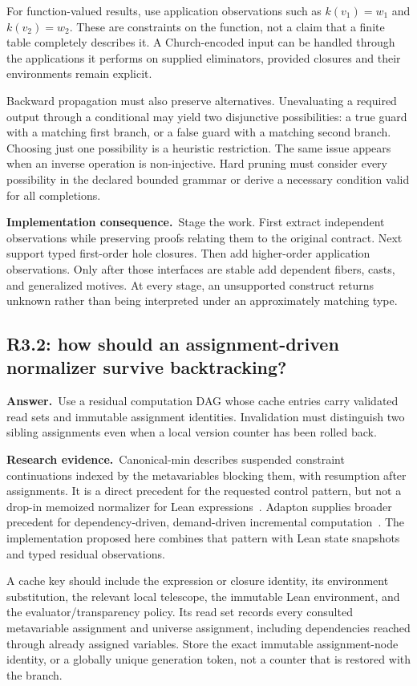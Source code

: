 \documentclass[11pt,a4paper]{article}
\theoremstyle{definition}
\theoremstyle{remark}
\newcommand{\ans}{\noindent\textbf{Answer.}\ }
\newcommand{\imp}{\par\noindent\textbf{Implementation consequence.}\ }
\newcommand{\lit}{\par\noindent\textbf{Research evidence.}\ }
\begin{document}
For function-valued results, use application observations such as
$k(v_1)=w_1$ and $k(v_2)=w_2$. These are constraints on the function, not a claim
that a finite table completely describes it. A Church-encoded input can be
handled through the applications it performs on supplied eliminators, provided
closures and their environments remain explicit.

Backward propagation must also preserve alternatives. Unevaluating a required
output through a conditional may yield two disjunctive possibilities: a true
guard with a matching first branch, or a false guard with a matching second
branch. Choosing just one possibility is a heuristic restriction. The same
issue appears when an inverse operation is non-injective. Hard pruning must
consider every possibility in the declared bounded grammar or derive a
necessary condition valid for all completions.

\imp Stage the work. First extract independent observations while preserving
proofs relating them to the original contract. Next support typed first-order
hole closures. Then add higher-order application observations. Only after
those interfaces are stable add dependent fibers, casts, and generalized
motives. At every stage, an unsupported construct returns unknown rather than
being interpreted under an approximately matching type.

\subsection{R3.2: how should an assignment-driven normalizer survive backtracking?}\label{q:R3.2}
\ans Use a residual computation DAG whose cache entries carry validated read
sets and immutable assignment identities. Invalidation must distinguish two
sibling assignments even when a local version counter has been rolled back.

\lit Canonical-min describes suspended constraint continuations indexed by
the metavariables blocking them, with resumption after assignments. It is a
direct precedent for the requested control pattern, but not a drop-in
memoized normalizer for Lean expressions~\cite{canonical-min}. Adapton supplies
broader precedent for dependency-driven, demand-driven incremental
computation~\cite{adapton}. The implementation proposed here combines that
pattern with Lean state snapshots and typed residual observations.

A cache key should include the expression or closure identity, its environment
substitution, the relevant local telescope, the immutable Lean environment,
and the evaluator/transparency policy. Its read set records every consulted
metavariable assignment and universe assignment, including dependencies
reached through already assigned variables. Store the exact immutable
assignment-node identity, or a globally unique generation token, not a
counter that is restored with the branch.
\end{document}
